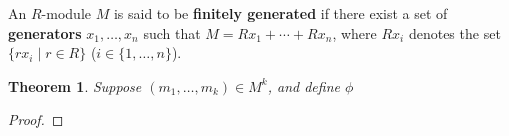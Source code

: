\documentclass[11pt]{article}
\newtheorem{theorem}{Theorem}
\begin{document}
An $R$-module $M$ is said to be \textbf{finitely generated} if there exist a set of \textbf{generators} $x_{1}, \ldots, x_{n}$ such that $M = Rx_{1} + \cdots + Rx_{n}$, where $Rx_{i}$ denotes the set $\{ rx_{i} \mid r \in R \}$ ($i \in \{ 1, \ldots, n \}$).

\begin{adjustwidth}{0.5cm}{}
  \begin{theorem}
    Suppose $(m_{1}, \ldots, m_{k}) \in M^{k}$, and define $\phi$
  \end{theorem}
  \begin{proof}
    
  \end{proof}
\end{adjustwidth}

\end{document}

